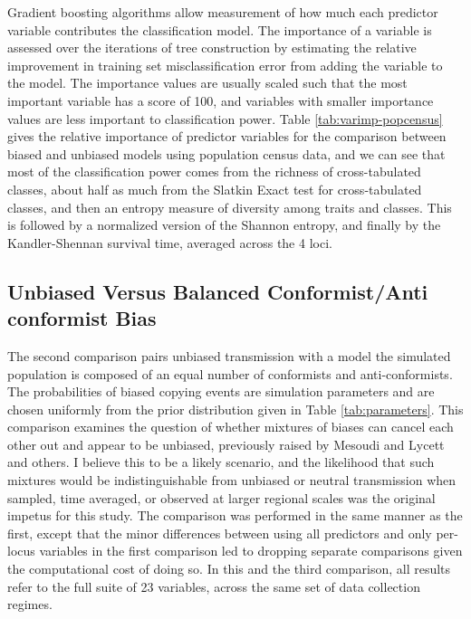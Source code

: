 \documentclass[10pt,letterpaper]{article}
\begin{document}
Gradient boosting algorithms allow measurement of how much each predictor variable contributes the classification model.  The importance of a variable is assessed over the iterations of tree construction by estimating the relative improvement in training set misclassification error from adding the variable to the model.  The importance values are usually scaled such that the most important variable has a score of 100, and variables with smaller importance values are less important to classification power.  Table \ref{tab:varimp-popcensus} gives the relative importance of predictor variables for the comparison between biased and unbiased models using population census data, and we can see that most of the classification power comes from the richness of cross-tabulated classes, about half as much from the Slatkin Exact test for cross-tabulated classes, and then an entropy measure of diversity among traits and classes.  This is followed by a normalized version of the Shannon entropy, and finally by the Kandler-Shennan survival time, averaged across the 4 loci.   

\subsection{Unbiased Versus Balanced Conformist/Anti conformist
Bias}\label{unbiased-versus-mixed-conformistanticonformist-bias}

The second comparison pairs unbiased transmission with a model the simulated population is composed of an equal number of conformists and anti-conformists.  The probabilities of  biased copying events are simulation parameters and are chosen uniformly from the prior distribution given in Table \ref{tab:parameters}.  This comparison examines the question of whether mixtures of biases can cancel each other out and appear to be unbiased, previously raised by Mesoudi and Lycett \cite{Mesoudi2009} and others.  I believe this to be a likely scenario, and the likelihood that such mixtures would be indistinguishable from unbiased or neutral transmission when sampled, time averaged, or observed at larger regional scales was the original impetus for this study.  The comparison was performed in the same manner as the first, except that the minor differences between using all predictors and only per-locus variables in the first comparison led to dropping separate comparisons given the computational cost of doing so.  In this and the third comparison, all results refer to the full suite of 23 variables, across the same set of data collection regimes.  
\end{document}
